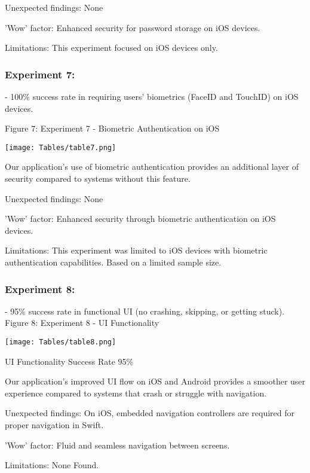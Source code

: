 \documentclass[12pt]{article}
\begin{document}
Unexpected findings: None

'Wow' factor: Enhanced security for password storage on iOS devices.

Limitations: This experiment focused on iOS devices only.

\subsubsection{Experiment 7:}

- 100\% success rate in requiring users' biometrics (FaceID and TouchID) on iOS devices.

Figure 7: Experiment 7 - Biometric Authentication on iOS

\begin{center}
\texttt{[image: Tables/table7.png]}
\end{center}

Our application's use of biometric authentication provides an additional layer of security compared to systems without this feature.

Unexpected findings: None

'Wow' factor: Enhanced security through biometric authentication on iOS devices.

Limitations: This experiment was limited to iOS devices with biometric authentication capabilities. Based on a limited sample size.

\subsubsection{Experiment 8:}


- 95\% success rate in functional UI (no crashing, skipping, or getting stuck).
\newline
Figure 8: Experiment 8 - UI Functionality
\newline
\begin{center}
\texttt{[image: Tables/table8.png]}
\end{center}
UI Functionality Success Rate 95\%    

Our application's improved UI flow on iOS and Android provides a smoother user experience compared to systems that crash or struggle with navigation.

Unexpected findings: On iOS, embedded navigation controllers are required for proper navigation in Swift.

'Wow' factor: Fluid and seamless navigation between screens.

Limitations: None Found.
\end{document}
